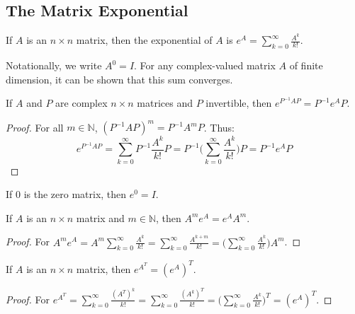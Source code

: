 \documentclass[crop=false,class=book,oneside]{standalone}
\begin{document}
        \subsection{The Matrix Exponential}
        \begin{definition}
        If $A$ is an $n\times n$ matrix, then the exponential of $A$ is $e^{A} =\sum_{k=0}^{\infty} \frac{A^k}{k!}$.
        \end{definition}
        \begin{remark}
        Notationally, we write $A^0 = I$. For any complex-valued matrix $A$ of finite dimension, it can be shown that this sum converges.
        \end{remark}
        \begin{theorem}
        If $A$ and $P$ are complex $n\times n$ matrices and $P$ invertible, then $e^{P^{-1}AP} = P^{-1}e^{A}P$.
        \end{theorem}
        \begin{proof}
        For all $m\in \mathbb{N}$, $(P^{-1}AP)^{m} = P^{-1}A^mP$. Thus:
        \begin{equation*}
            e^{P^{-1}AP} = \sum_{k=0}^{\infty} P^{-1}\frac{A^k}{k!}P = P^{-1}\big(\sum_{k=0}^{\infty} \frac{A^k}{k!}\big)P = P^{-1}e^A P
        \end{equation*}
        \end{proof}
        \begin{theorem}
        If $0$ is the zero matrix, then $e^0 = I$.
        \end{theorem}
        \begin{theorem}
        If $A$ is an $n\times n$ matrix and $m\in \mathbb{N}$, then $A^{m} e^{A} = e^{A} A^{m}$.
        \end{theorem}
        \begin{proof}
        For $A^{m} e^{A} = A^{m} \sum_{k=0}^{\infty} \frac{A^{k}}{k!} = \sum_{k=0}^{\infty} \frac{A^{k+m}}{k!} = \big(\sum_{k=0}^{\infty} \frac{A^k}{k!}\big)A^{m}$.
        \end{proof}
        \begin{theorem}
        If $A$ is an $n\times n$ matrix, then $e^{A^{T}} = (e^{A})^{T}$.
        \end{theorem}
        \begin{proof}
        For $e^{A^{T}} = \sum_{k=0}^{\infty} \frac{(A^{T})^{k}}{k!} = \sum_{k=0}^{\infty} \frac{(A^{k})^{T}}{k!} = \big(\sum_{k=0}^{\infty} \frac{A^{k}}{k!}\big)^{T} = (e^{A})^{T}$.
        \end{proof}
\end{document}
